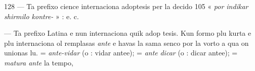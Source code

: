 \begin{VUpage}[132]{128}
 --- Ta prefixo cience internaciona adoptesis per la\nl
decido 105 « \textit{por indikar shirmilo kontre-} » : \cc
{}\cc
{} e. c.

 --- Ta prefixo Latina e nun internaciona quik adop\cc
tesis. Kun formo plu kurta e plu internaciona ol remplasas\nl
\textit{ante} e havas la sama senco por la vorto a qua on unionas\nl
lu.  = \textit{ante-vidar} (o : vidar antee);  = \textit{ante}\cc
\textit{dicar} (o : dicar antee);  = \textit{matura ante} la tempo,\parplein
\end{VUpage}

